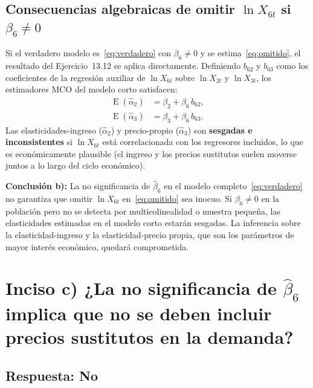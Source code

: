 \documentclass[12pt, letterpaper]{article}
\newcommand{\E}{\operatorname{E}}
\begin{document}
\subsection{Consecuencias algebraicas de omitir $\ln X_{6t}$ si $\beta_6 \neq 0$}

Si el verdadero modelo es~\eqref{eq:verdadero} con $\beta_6 \neq 0$ y
se estima~\eqref{eq:omitido}, el resultado del Ejercicio~13.12 se aplica
directamente. Definiendo $b_{62}$ y $b_{63}$ como los coeficientes de
la regresión auxiliar de $\ln X_{6t}$ sobre $\ln X_{2t}$ y $\ln X_{3t}$,
los estimadores MCO del modelo corto satisfacen:
\begin{align}
  \E(\hat{\alpha}_2) &= \beta_2 + \beta_6\, b_{62},
  \label{eq:sesgo_a2}\\
  \E(\hat{\alpha}_3) &= \beta_3 + \beta_6\, b_{63}.
  \label{eq:sesgo_a3}
\end{align}
Las elasticidades-ingreso ($\hat{\alpha}_2$) y precio-propio
($\hat{\alpha}_3$) son \textbf{sesgadas e inconsistentes} si
$\ln X_{6t}$ está correlacionada con los regresores incluidos, lo que
es económicamente plausible (el ingreso y los precios sustitutos
suelen moverse juntos a lo largo del ciclo económico).

\begin{clave}
  \textbf{Conclusión b):} La no significancia de $\hat{\beta}_6$ en el
  modelo completo~\eqref{eq:verdadero} no garantiza que omitir
  $\ln X_{6t}$ en~\eqref{eq:omitido} sea inocuo. Si $\beta_6 \neq 0$
  en la población pero no se detecta por multicolinealidad o muestra
  pequeña, las elasticidades estimadas en el modelo corto estarán
  sesgadas. La inferencia sobre la elasticidad-ingreso y la
  elasticidad-precio propia, que son los parámetros de mayor interés
  económico, quedará comprometida.
\end{clave}

\section{Inciso c) ¿La no significancia de $\hat{\beta}_6$ implica que no
         se deben incluir precios sustitutos en la demanda?}

\subsection*{Respuesta: No}
\end{document}
